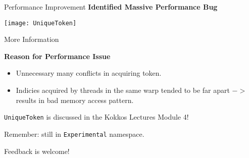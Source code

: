 \begin{frame}[fragile]{Performance Improvement}
\textbf{Identified Massive Performance Bug}

\vspace{3pt}

\begin{center}
  \texttt{[image: UniqueToken]}
\end{center}
\end{frame}


\begin{frame}[fragile]{More Information}

\textbf{Reason for Performance Issue}
\begin{itemize}
  \item Unnecessary many conflicts in acquiring token.
  \item Indicies acquired by threads in the same warp tended to be far apart $->$ results in bad memory access pattern.
\end{itemize}

\vspace{10pt}
\begin{center}
\texttt{UniqueToken} is discussed in the Kokkos Lectures Module 4!

\vspace{20pt}
Remember: still in \texttt{Experimental} namespace.

Feedback is welcome!
\end{center}
\end{frame}

